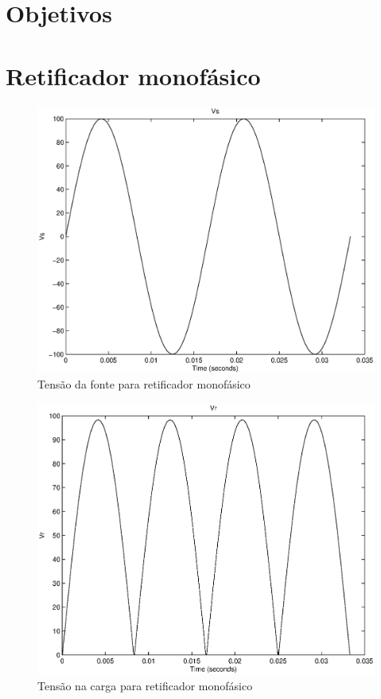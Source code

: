 \documentclass{report}
\begin{document}


\onehalfspacing
\section{Objetivos}

\section{Retificador monofásico}
\begin{figure}[H]
	\centering
	\includegraphics[width=0.7\linewidth]{matlab/mono_vs}
	\caption{Tensão da fonte para retificador monofásico}
	\label{fig:mvs}
\end{figure}
\begin{figure}[H]
	\centering
	\includegraphics[width=0.7\linewidth]{matlab/mono_vr}
	\caption{Tensão na carga para retificador monofásico}
	\label{fig:mvr}
\end{figure}
\end{document}
